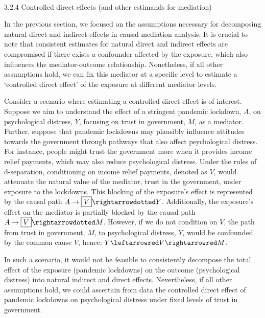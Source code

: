 \documentclass[
  singlecolumn]{article}
\makeatletter
\let\oldparagraph\paragraph
\renewcommand{\paragraph}{
    \@ifstar
      \xxxParagraphStar
      \xxxParagraphNoStar
  }
\newcommand{\xxxParagraphStar}[1]{\oldparagraph*{#1}\mbox{}}
\newcommand{\xxxParagraphNoStar}[1]{\oldparagraph{#1}\mbox{}}
\makeatother
\begin{document}
\paragraph{3.2.4 Controlled direct effects (and other estimands for
mediation)}\label{controlled-direct-effects-and-other-estimands-for-mediation}

In the previous section, we focused on the assumptions necessary for
decomposing natural direct and indirect effects in causal mediation
analysis. It is crucial to note that consistent estimates for natural
direct and indirect effects are compromised if there exists a confounder
affected by the exposure, which also influences the mediator-outcome
relationship. Nonetheless, if all other assumptions hold, we can fix
this mediator at a specific level to estimate a `controlled direct
effect' of the exposure at different mediator levels.

Consider a scenario where estimating a controlled direct effect is of
interest. Suppose we aim to understand the effect of a stringent
pandemic lockdown, \(A\), on psychological distress, \(Y\), focusing on
trust in government, \(M\), as a mediator. Further, suppose that
pandemic lockdowns may plausibly influence attitudes towards the
government through pathways that also affect psychological distress. For
instance, people might trust the government more when it provides income
relief payments, which may also reduce psychological distress. Under the
rules of d-separation, conditioning on income relief payments, denoted
as \(V\), would attenuate the natural value of the mediator, trust in
the government, under exposure to the lockdowns. This blocking of the
exposure's effect is represented by the causal path
\(A \to \boxed{V} \rightarrowdotted Y\). Additionally, the exposure's
effect on the mediator is partially blocked by the causal path
\(A \to \boxed{V} \rightarrowdotted M\). However, if we do not condition
on \(V\), the path from trust in government, \(M\), to psychological
distress, \(Y\), would be confounded by the common cause \(V\), hence:
\(Y \leftarrowred V \rightarrowred M\).

In such a scenario, it would not be feasible to consistently decompose
the total effect of the exposure (pandemic lockdowns) on the outcome
(psychological distress) into natural indirect and direct effects.
Nevertheless, if all other assumptions hold, we could ascertain from
data the controlled direct effect of pandemic lockdowns on psychological
distress under fixed levels of trust in government.
\end{document}
